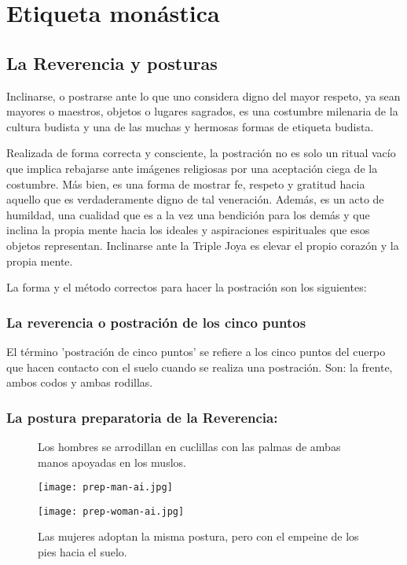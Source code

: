 \chapter{Etiqueta monástica}
\label{etiquette}

\section{La Reverencia y posturas}

Inclinarse, o postrarse ante lo que uno considera digno del mayor respeto, ya sean mayores o maestros, objetos o lugares sagrados, es una costumbre milenaria de la cultura budista y una de las muchas y hermosas formas de etiqueta budista.

Realizada de forma correcta y consciente, la postración no es solo un ritual vacío que implica rebajarse ante imágenes religiosas por una aceptación ciega de la costumbre. Más bien, es una forma de mostrar fe, respeto y gratitud hacia aquello que es verdaderamente digno de tal veneración. Además, es un acto de humildad, una cualidad que es a la vez una bendición para los demás y que inclina la propia mente hacia los ideales y aspiraciones espirituales que esos objetos representan. Inclinarse ante la Triple Joya es elevar el propio corazón y la propia mente.

La forma y el método correctos para hacer la postración son los siguientes:

\subsection{La reverencia o postración de los cinco puntos}

El término 'postración de cinco puntos' se refiere a los cinco puntos del cuerpo que hacen contacto con el suelo cuando se realiza una postración. Son: la frente, ambos codos y ambas rodillas.

\captionsetup{font=small, labelformat=empty, position=above}

\subsection{La postura preparatoria de la Reverencia:}

\begin{figure}[h]
	\centering
	
	\begin{minipage}{0.40\textwidth}
		\centering
		\caption{Los hombres se arrodillan en cuclillas con las palmas de ambas manos apoyadas en los muslos.}
		\texttt{[image: prep-man-ai.jpg]}
		
	\end{minipage}
	\hfill
	\begin{minipage}{0.40\textwidth}
		\centering
		\caption{Las mujeres adoptan la misma postura, pero con el empeine de los pies hacia el suelo.}
		\texttt{[image: prep-woman-ai.jpg]}
		
	\end{minipage}
	
\end{figure}


